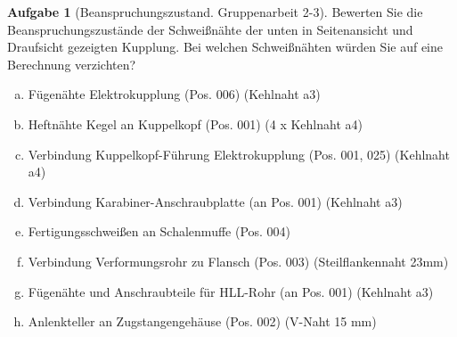 \documentclass[10pt,a4paper,headsepline,smallheadings]{scrartcl}
\theoremstyle{definition}
\newtheorem{aufgabe}{Aufgabe}
\begin{document}
\begin{aufgabe}[Beanspruchungszustand. Gruppenarbeit 2-3] 
Bewerten Sie die Beanspruchungszust\"ande der Schwei{\ss}n\"ahte der unten in Seitenansicht und Draufsicht gezeigten Kupplung. Bei welchen Schwei{\ss}n\"ahten w\"urden Sie auf eine Berechnung verzichten?

\begin{enumerate}[a)]
\item F\"ugen\"ahte Elektrokupplung (Pos. 006) (Kehlnaht a3)
\item Heftn\"ahte Kegel an Kuppelkopf (Pos. 001) (4 x Kehlnaht a4)
\item Verbindung Kuppelkopf-F\"uhrung Elektrokupplung (Pos. 001, 025) (Kehlnaht a4)
\item Verbindung Karabiner-Anschraubplatte (an Pos. 001) (Kehlnaht a3)
\item Fertigungsschwei{\ss}en an Schalenmuffe (Pos. 004)
\item Verbindung Verformungsrohr zu Flansch (Pos. 003) (Steilflankennaht 23mm)
\item F\"ugen\"ahte und Anschraubteile f\"ur HLL-Rohr (an Pos. 001) (Kehlnaht a3)
\item Anlenkteller an Zugstangengeh\"ause (Pos. 002) (V-Naht 15 mm)
\end{enumerate}

\end{aufgabe}
\end{document}
